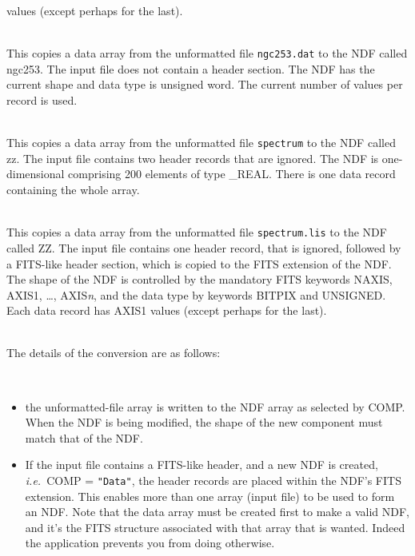 \documentclass[twoside,11pt]{article}
\newcommand{\latex}[1]{#1}
\newlength{\sstexampleslength}
\newcommand{\sstexamplesubsection}[2]{\sloppy
\item[\parbox{\sstexampleslength}{\ssttt #1}] \mbox{} \vspace{0.5ex}
\\ #2 \vspace{1.0ex}}
\newcommand{\sstnotes}[1]{\pagebreak[3] \item[Notes:] \mbox{} \\[1.3ex] #1}
\newcommand{\ssthitemlist}[1]{
  \latex{
  \mbox{} \\
  \vspace{-3.5ex}
  }
  \begin{itemize}
     #1
  \end{itemize}
}
\newcommand{\sstitem}{\item}
\newcommand{\sstexamplesubsection}[2]{
   \vspace{-1.0ex} \item[{\ssttt #1}] #2 \vspace{0.2ex}}
\newcommand{\sstnotes}[1]{\item[Notes:]
      \begin{description}
         #1
      \end{description}
   }
\newcommand{\sstitem}{\item}
\begin{document}
{{{         values (except perhaps for the last).
      }
      \sstexamplesubsection{
         unf2ndf type="\_uword" in=ngc253.dat out=ngc253 $\backslash$
      }{
         This copies a data array from the unformatted file \texttt{ngc253.dat}
         to the NDF called ngc253.  The input file does not contain a
         header section.  The NDF has the current shape and data type
         is unsigned word.  The current number of values per record is
         used.
      }
      \sstexamplesubsection{
         unf2ndf spectrum zz skip=2 shape=200 noperec=!
      }{
         This copies a data array from the unformatted file \texttt{spectrum}
         to the NDF called zz.  The input file contains two header
         records that are ignored.  The NDF is one-dimensional
         comprising 200 elements of type \_REAL.  There is one data
         record containing the whole array.
      }
      \sstexamplesubsection{
         unf2ndf spectrum.lis ZZ skip=1 fits noperec=20
      }{
         This copies a data array from the unformatted file 
         \texttt{spectrum.lis}
         to the NDF called ZZ.  The input file contains one header
         record, that is ignored, followed by a FITS-like header
         section, which is copied to the FITS extension of the NDF.
         The shape of the NDF is controlled by the mandatory FITS
         keywords NAXIS, AXIS1, \ldots, AXIS{\em{n}}, and the data type by
         keywords BITPIX and UNSIGNED.  Each data record has AXIS1
         values (except perhaps for the last).
      }
   }
   \sstnotes{
      The details of the conversion are as follows:
      \ssthitemlist{

         \sstitem
            the unformatted-file array is written to the NDF array as
            selected by COMP.  When the NDF is being modified, the shape
            of the new component must match that of the NDF.

         \sstitem
            If the input file contains a FITS-like header, and a new
            NDF is created, {\it i.e.}\ COMP = \texttt{"Data"}, the header
            records are placed within the NDF's FITS extension.  This enables 
            more than one array (input file) to be used to form an NDF.  Note
            that the data array must be created first to make a valid NDF,
            and it's the FITS structure associated with that array that is
            wanted.  Indeed the application prevents you from doing
            otherwise.

}}}
\end{document}
